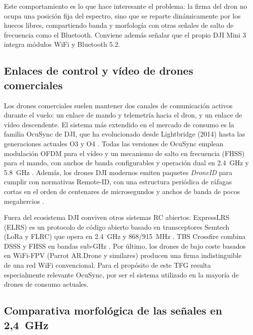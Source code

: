 Este comportamiento es lo que hace interesante el problema: la firma del dron no ocupa una posición fija del espectro, sino que se reparte dinámicamente por los huecos libres, compartiendo banda y morfología con otras señales de salto de frecuencia como el Bluetooth. Conviene además señalar que el propio DJI Mini 3 integra módulos WiFi y Bluetooth 5.2.








\subsection{Enlaces de control y vídeo de drones comerciales}
\label{subsec:enlaces_drones}

Los drones comerciales suelen mantener dos canales de comunicación activos durante el vuelo: un enlace de mando y telemetría hacia el dron, y un enlace de vídeo descendente. El sistema más extendido en el mercado de consumo es la familia OcuSync de DJI, que ha evolucionado desde Lightbridge (2014) hasta las generaciones actuales O3 y O4 \cite{heliguy_dji_transmission}. Todas las versiones de OcuSync emplean modulación OFDM para el vídeo y un mecanismo de salto en frecuencia (FHSS) para el mando, con anchos de banda configurables y operación dual en \SI{2.4}{\giga\hertz} y \SI{5.8}{\giga\hertz} \cite{schiller2023droneid}. Además, los drones DJI modernos emiten paquetes \emph{DroneID} para cumplir con normativas Remote-ID, con una estructura periódica de ráfagas cortas en el orden de centenares de microsegundos y anchos de banda de pocos megahercios \cite{schiller2023droneid,vainilavicius2024dji}.

Fuera del ecosistema DJI conviven otros sistemas RC abiertos. ExpressLRS (ELRS) es un protocolo de código abierto basado en transceptores Semtech (LoRa y FLRC) que opera en \SI{2.4}{\giga\hertz} y \num{868}/\SI{915}{\mega\hertz} \cite{expresslrs}. TBS Crossfire combina DSSS y FHSS en bandas sub-GHz \cite{tbs_crossfire}. Por último, los drones de bajo coste basados en WiFi-FPV (Parrot AR.Drone y similares) producen una firma indistinguible de una red WiFi convencional. Para el propósito de este TFG resulta especialmente relevante OcuSync, por ser el sistema utilizado en la mayoría de drones de consumo actuales.






\subsection{Comparativa morfológica de las señales en 2,4~GHz}
\label{subsec:comparativa_morfologia}

